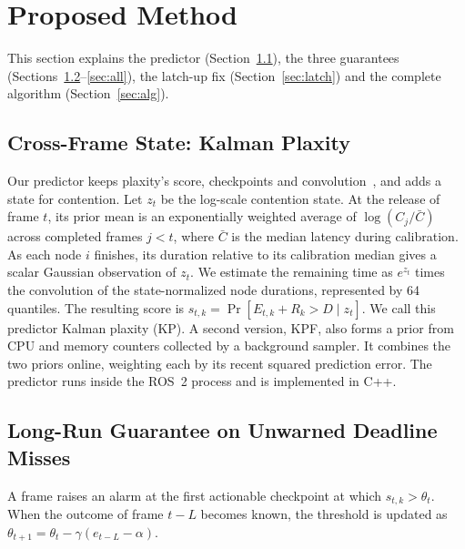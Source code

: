 \documentclass[acmsmall,screen]{acmart}
\begin{document}
\section{Proposed Method}\label{sec:method}

This section explains the predictor (Section~\ref{sec:kp}), the three guarantees (Sections~\ref{sec:aci}--\ref{sec:all}), the latch-up fix (Section~\ref{sec:latch}) and the complete algorithm (Section~\ref{sec:alg}).

\subsection{Cross-Frame State: Kalman Plaxity}\label{sec:kp}

Our predictor keeps plaxity's score, checkpoints and convolution~\cite{toba2024,toba2026}, and adds a state for contention. Let $z_t$ be the log-scale contention state. At the release of frame $t$, its prior mean is an exponentially weighted average of $\log(C_j/\bar C)$ across completed frames $j<t$, where $\bar C$ is the median latency during calibration. As each node $i$ finishes, its duration relative to its calibration median gives a scalar Gaussian observation of $z_t$. We estimate the remaining time as $e^{z_t}$ times the convolution of the state-normalized node durations, represented by 64 quantiles. The resulting score is $s_{t,k}=\Pr[E_{t,k}+R_k>D\mid z_t]$. We call this predictor Kalman plaxity (KP). A second version, KPF, also forms a prior from CPU and memory counters collected by a background sampler. It combines the two priors online, weighting each by its recent squared prediction error. The predictor runs inside the ROS~2 process and is implemented in C++.

\subsection{Long-Run Guarantee on Unwarned Deadline Misses}\label{sec:aci}

A frame raises an alarm at the first actionable checkpoint at which $s_{t,k}>\theta_t$. When the outcome of frame $t-L$ becomes known,
the threshold is updated as $\theta_{t+1}=\theta_t-\gamma(e_{t-L}-\alpha)$.
\end{document}
